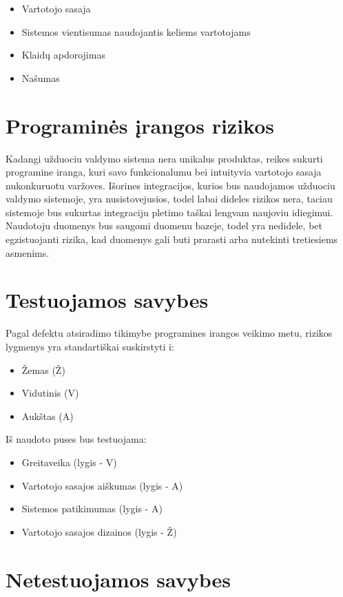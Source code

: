\documentclass{VUMIFPSkursinis}
\begin{document}
\begin{itemize}
	\item Vartotojo sasaja
	\item Sistemos vientisumas naudojantis keliems vartotojams
	\item Klaidų apdorojimas
	\item Našumas
\end{itemize}


\section{Programinės įrangos rizikos}

Kadangi užduociu valdymo sistema nera unikalus produktas, reikes sukurti programine iranga,
kuri savo funkcionalumu bei intuityvia vartotojo sasaja nukonkuruotu varžoves.
Išorines integracijos, kurios bus naudojamos užduociu valdymo sistemoje, yra nusistovejusios, todel labai dideles
rizikos nera, taciau sistemoje bus sukurtas integraciju pletimo taškai lengvam naujoviu idiegimui.
Naudotoju duomenys bus saugomi duomenu bazeje, todel yra nedidele, bet egzistuojanti rizika, kad duomenys gali buti
prarasti arba nutekinti tretiesiems asmenims.


\section{Testuojamos savybes}

Pagal defektu atsiradimo tikimybe programines irangos veikimo metu, rizikos lygmenys yra standartiškai suskirstyti i:

\begin{itemize}
	\item Žemas (Ž)
	\item Vidutinis (V)
	\item Aukštas (A)
\end{itemize}

Iš naudoto puses bus testuojama:

\begin{itemize}
	\item Greitaveika (lygis - V)
	\item Vartotojo sasajos aiškumas (lygis - A)
	\item Sistemos patikimumas (lygis - A)
	\item Vartotojo sasajos dizainos (lygis - Ž)
\end{itemize}


\section{Netestuojamos savybes}
\end{document}
